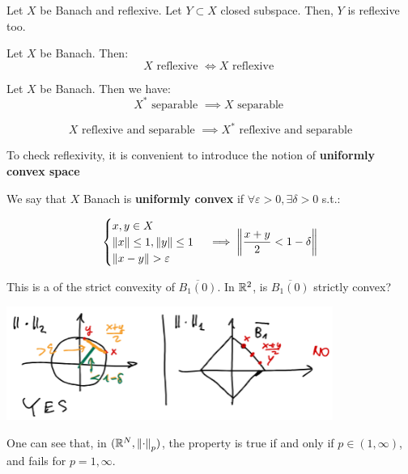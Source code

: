 \begin{ftheorem}
    Let $X$ be Banach and reflexive. Let $Y \subset X$ closed subspace.
    Then, $Y$ is reflexive too.
\end{ftheorem}

\begin{ftheorem}
    Let $X$ be Banach. Then:
    $$X \text{ reflexive } \iff X \text{ reflexive }$$

\end{ftheorem}

\begin{ftheorem}
    Let $X$ be Banach. Then we have:
    $$X^* \text{ separable } \implies X \text{ separable }$$

    $$X \text{ reflexive and separable } \implies X^* \text{ reflexive and separable}$$
\end{ftheorem}

\begin{note}
    To check reflexivity, it is convenient to introduce the notion 
    of \textbf{uniformly convex space}
\end{note}

\vspace{1em}

\begin{fdefinition}
    We say that $X$ Banach is \textbf{uniformly convex} if $\forall \varepsilon > 0,
    \exists \delta > 0$ s.t.:

    $$\begin{cases}
        x, y \in X\\
        \left\|x\right\| \leq 1, \left\|y\right\| \leq 1\\
        \left\|x-y\right\| > \varepsilon
    \end{cases} \implies \left\|\frac{x+y}{2} < 1 - \delta\right\|$$
\end{fdefinition}

\begin{note}
    This is a  of the strict convexity of 
    $\overline{B_1(0)}$. In $\mathbb{R}^2$, is $\overline{B_1(0)}$ strictly convex?

    \begin{center}
        \includegraphics[width=0.8\textwidth]{figures/strict_convex.png}
    \end{center}

    One can see that, in $(\mathbb{R}^N, \left\|\cdot\right\|_p)$, the property is true if and
    only if $p \in (1, \infty)$, and fails for $p = 1, \infty$.
\end{note}

